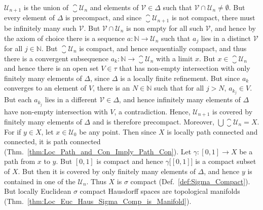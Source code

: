 \documentclass{article}                                                        %
\begin{document}
\begin{solution}
                $\mathcal{U}_{n+1}$ is the union of $\closure{\mathcal{U}_{n}}$ and
                elements of $\mathcal{V}\in\Delta$ such that
                $\mathcal{V}\cap\mathcal{U}_{n}\ne\emptyset$. But every element of
                $\Delta$ is precompact, and since $\closure{\mathcal{U}_{n+1}}$ is
                not compact, there must be infinitely many such $\mathcal{V}$. But
                $\mathcal{V}\cap\mathcal{U}_{n}$ is non
                empty for all such $\mathcal{V}$, and hence by the axiom of choice
                there is a sequence $a:\mathbb{N}\rightarrow\mathcal{U}_{n}$ such
                that $a_{j}$ lies in a distinct $\mathcal{V}$ for all
                $j\in\mathbb{N}$. But $\closure{\mathcal{U}_{n}}$ is compact, and
                hence sequentially compact, and thus there is a convergent
                subsequence $a_{k}:\mathbb{N}\rightarrow\closure{\mathcal{U}_{n}}$
                with a limit $x$. But $x\in\closure{\mathcal{U}_{n}}$ and hence
                there is an open set $V\in\tau$ that has non-empty intersection with
                only finitely many elements of $\Delta$, since $\Delta$ is a locally
                finite refinement. But since $a_{k}$ converges to an element of $V$,
                there is an $N\in\mathbb{N}$ such that for all $j>N$,
                $a_{k_{j}}\in{V}$. But each $a_{k_{j}}$ lies in a different
                $\mathcal{V}\in\Delta$, and hence infinitely many elements of
                $\Delta$ have non-empty intersection with $V$, a contradiction.
                Hence, $\mathcal{U}_{n+1}$ is covered by finitely many elements of
                $\Delta$ and is therefore precompact. Moreover,
                $\bigcup\closure{\mathcal{U}_{n}}=X$. For if $y\in{X}$, let
                $x\in\mathcal{U}_{0}$ be any point. Then since $X$ is locally path
                connected and connected, it is path connected
                (Thm.~\ref{thm:Loc_Path_and_Con_Imply_Path_Con}).
                Let $\gamma:[0,1]\rightarrow{X}$ be a path from $x$ to $y$. But
                $[0,1]$ is compact and hence $\gamma\big[[0,1]\big]$ is a compact
                subset of $X$. But then it is covered by only finitely many elements
                of $\Delta$, and hence $y$ is contained in one of the
                $\mathcal{U}_{n}$. Thus $X$ is $\sigma$ compact
                (Def.~\ref{def:Sigma_Compact}). But locally Euclidean $\sigma$
                compact Hausdorff spaces are topological manifolds
                (Thm.~\ref{thm:Loc_Euc_Haus_Sigma_Comp_is_Manifold}).
            \end{solution}
\end{document}
